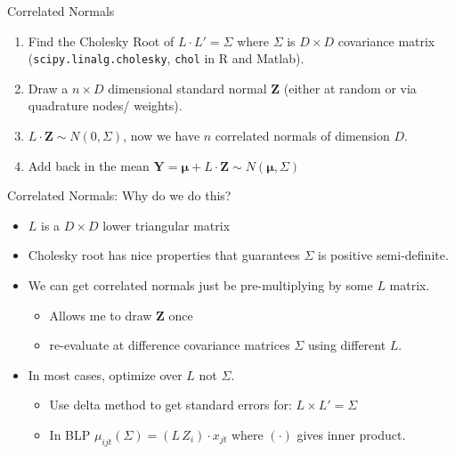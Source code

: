 \documentclass[aspectratio=169,11pt]{beamer}
\begin{document}
\begin{frame}{Correlated Normals}
\begin{enumerate}
\item Find the \alert{Cholesky Root} of $L \cdot L' =\Sigma$ where $\Sigma$ is $D \times D$ covariance matrix\\ (\texttt{scipy.linalg.cholesky}, \texttt{chol} in R and Matlab).
\item Draw a $n \times D$ dimensional standard normal $\symbf{Z}$ (either at random or via quadrature nodes/ weights).
\item $L \cdot \symbf{Z} \sim N(0,\Sigma)$, now we have $n$ correlated normals of dimension $D$.
\item Add back in the mean $\symbf{Y}=\symbf{\mu} + L \cdot \symbf{Z} \sim N(\symbf{\mu},\Sigma)$
\end{enumerate}
\end{frame}

\begin{frame}{Correlated Normals: Why do we do this?}
\begin{itemize}
\item $L$ is a $D \times D$ \alert{lower triangular matrix}\\
\item Cholesky root has nice properties that guarantees $\Sigma$ is positive semi-definite.
\item We can get correlated normals just be pre-multiplying by some $L$ matrix.
\begin{itemize}
\item Allows me to draw $\symbf{Z}$ once
\item  re-evaluate at difference covariance matrices $\Sigma$ using different $L$.
\end{itemize}
\item In most cases, \alert{optimize over $L$} not $\Sigma$.
\begin{itemize}
\item Use delta method to get standard errors for: $L \times L' = \Sigma$
\item In BLP $\mu_{ijt}(\Sigma) = (L \, Z_i) \cdot x_{jt} $ where $(\cdot)$ gives \alert{inner product}.
\end{itemize}
\end{itemize}

\end{frame}
\end{document}
